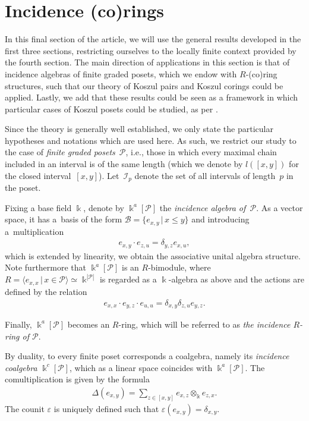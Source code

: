 \documentclass[pdftex]{sigma}
\newcommand\ot{\otimes}
\newcommand\kal{\mathscr}
\newcommand{\kap}{\Bbbk^a[\kal{P}]}
\renewcommand{\^}[1]{\mbox{$^{\left( #1 \right)}$}}
\renewcommand{\_}[1]{\mbox{$_{\left( #1 \right)}$}}
\newcommand{\de}{\delta}
\numberwithin{equation}{section}
\begin{document}
\section{Incidence (co)rings}\label{section6}
In this f\/inal section of the article, we will use the general results developed in the f\/irst three sections, restricting ourselves to the locally f\/inite context provided by the fourth section. The main direction of applications in this section is that of incidence algebras of f\/inite graded posets, which we endow with $R$-(co)ring structures, such that our theory of Koszul pairs and Koszul corings could be applied. Lastly, we add that these results could be seen as a framework in which particular cases of Koszul posets could be studied, as per \cite[Section~2]{mst}.

Since the theory is generally well established, we only state the particular hypotheses and notations which are used here. As such, we restrict our study to the case of \emph{finite graded posets}~$\kal{P}$, i.e., those in which every maximal chain included in an interval is of the same length (which we denote by $l([x,y])$ for the closed interval~$[x,y]$). Let~$\kal{I}_p$ denote the set of all intervals of length~$p$ in the poset.

Fixing a base f\/ield $\Bbbk$, denote by $\kap$ the \emph{incidence algebra of~$\kal{P}$}. As a vector space, it has a~basis of the form $\kal{B} = \{e_{x,y} \,|\, x \leq y \}$ and introducing a~multiplication
\begin{gather*}
	e_{x,y} \cdot e_{z,u} = \delta_{y,z}e_{x,u},
\end{gather*}
which is extended by linearity, we obtain the associative unital algebra structure. Note furthermore that $\Bbbk^a[\kal{P}]$ is an $R$-bimodule, where $R=\langle e_{x,x}\,|\, x\in\kal{P} \rangle \simeq \Bbbk^{|\kal{P}|}$ is regarded as a $\Bbbk$-algebra as above and the actions are def\/ined by the relation
\begin{gather*} e_{x,x}\cdot e_{y,z}\cdot e_{u,u}=\de_{x,y}\de_{z,u}e_{y,z}. \end{gather*}

Finally, $\kap$ becomes an $R$-ring, which will be referred to as \emph{the incidence $R$-ring of $\kal{P}$}.

By duality, to every f\/inite poset corresponds a coalgebra, namely its \emph{incidence coalgebra} $\Bbbk^c[\kal{P}]$, which as a linear space coincides with $\kap$. The comultiplication is given by the formula
\begin{gather*}
\Delta(e_{x,y}) = \sum_{z \in [x,y]} e_{x,z} \ot_\Bbbk e_{z,x}.\end{gather*}
The counit $\varepsilon$ is uniquely def\/ined such that $\varepsilon(e_{x,y})=\de_{x,y}$.
\end{document}
